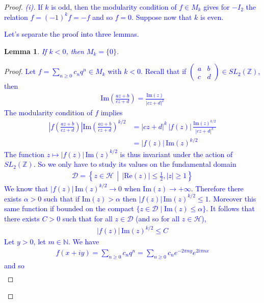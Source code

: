 \documentclass[12pt,a4paper,english]{article}
\theoremstyle{plain}
\newtheorem{lem}[thm]{Lemma}
\theoremstyle{definition}
\begin{document}
\begin{proof}
\textcolor{blue}{
\textit{(i).} If $k$ is odd, then the modularity condition of $f\in M_k$ gives for $-I_2$ the relation $f=(-1)^kf=-f$ and so $f=0$.
Suppose now that $k$ is even.
}

\textcolor{blue}{
Let's separate the proof into three lemmas.
}
\begin{lem}
\textcolor{blue}{
If $k<0$, then $M_k=\{0\}$.
}
\end{lem}
\begin{proof}
\textcolor{blue}{
Let $f=\sum_{n\geqslant 0}c_n q^n\in M_k$ with $k<0$. Recall that if $\begin{pmatrix} a & b \\ c & d \end{pmatrix}\in SL_2(\mathbb{Z})$, then
\begin{align*}
\text{Im}\left(\frac{az+b}{cz+d}\right)=\frac{\text{Im}(z)}{|cz+d|^2}
\end{align*}
The modularity condition of $f$ implies
\begin{align*}
\left| f\left(\frac{az+b}{cz+d}\right)\right| \text{Im}\left(\frac{az+b}{cz+d}\right)^{k/2}&=|cz+d|^k\, |f(z)|\,\frac{\text{Im} (z)^{k/2}}{|cz+d|^k}\\
&=|f(z)|\,\text{Im} (z)^{k/2}
\end{align*}
The function $z\mapsto |f(z)|\,\text{Im} (z)^{k/2}$ is thus invariant under the action of $SL_2(\mathbb{Z})$. So we only have to study its values on the fundamental domain
\begin{align*}
\mathcal{D}=\left\{z\in\mathcal{H}\,\middle|\,|\text{Re}(z)|\leqslant\frac{1}{2}, |z|\geqslant 1\right\}
\end{align*}
We know that $|f(z)|\,\text{Im}(z)^{k/2}\to 0$ when $\text{Im}(z)\to +\infty$. Therefore there exists $\alpha>0$ such that if $\text{Im}(z)>\alpha$ then $|f(z)|\,\text{Im}(z)^{k/2}\leqslant 1$. Moreover this same function if bounded on the compact $\{z\in\mathcal{D}\mid \text{Im}(z)\leqslant\alpha\}$. It follows that there exists $C>0$ such that for all $z\in\mathcal{D}$ (and so for all $z\in\mathcal{H}$),
\begin{align*}
|f(z)|\,\text{Im}(z)^{k/2}\leqslant C
\end{align*}
Let $y>0$, let $m\in\mathbb{N}$. We have
\begin{align*}
f(x+iy)=\sum_{n\geqslant 0}c_n q^n=\sum_{n\geqslant 0}c_ne^{-2\pi ny}e^{2i\pi nx}
\end{align*}
and so
\begin{align*}

\end{align*}}
\end{proof}
\end{proof}
\end{document}
